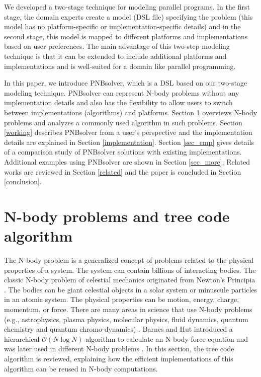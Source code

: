 \documentclass[draftclsnofoot]{elsarticle}
\begin{document}
We developed a two-stage technique for modeling parallel programs. In the first stage, the domain experts create a model (DSL file) specifying 
the problem (this model has no platform-specific or implementation-specific details) and in the second stage,  this model is mapped to different platforms and implementations
 based on user preferences. The main advantage of this two-step modeling technique is that it can be extended to include additional platforms and implementations and is well-suited
 for a domain like parallel programming.

In this paper, we introduce PNBsolver, which is a DSL based on our two-stage modeling technique. PNBsolver can represent
N-body problems without any implementation details and also has the flexibility to allow users to switch between implementations (algorithms) and platforms. 
Section \ref{analysis} overviews N-body problems and analyzes a commonly used algorithm in such problems. Section \ref{working} describes PNBsolver from a user's perspective
and the implementation details are explained in Section \ref{implementation}. Section \ref{sec_cmp} gives details of a comparison study of PNBsolver solutions with existing
implementations. Additional examples using PNBsolver are shown in Section \ref{sec_more}. Related works are reviewed in Section \ref{related} and the paper is concluded in 
Section \ref{conclusion}.


\section{N-body problems and tree code algorithm}
\label{analysis}

The N-body problem is a generalized concept of problems related to the physical properties of a system.
 The system can contain billions of interacting bodies.
The classic N-body problem of celestial mechanics originated from Newton's Principia \cite{diacu}.  The bodies can be giant celestial 
objects in a solar system or minuscule particles in an atomic system. The physical properties can be motion, energy, charge, momentum, or force. 
There are many areas in science that use N-body problems (e.g., astrophysics, plasma physics, molecular physics, fluid dynamics, 
quantum chemistry and quantum chromo-dynamics) \cite{watson,jastrow,sasai,carlson}.
Barnes and Hut \cite{barnes} introduced a hierarchical $ \mathcal{O}(N\log{N})$ algorithm to calculate an N-body force equation and was later used in 
different N-body problems \cite{krasny1, krasny2,xu}. In this section, the tree code algorithm is 
reviewed, explaining how the efficient implementations of this algorithm can be reused in N-body computations.
\end{document}

